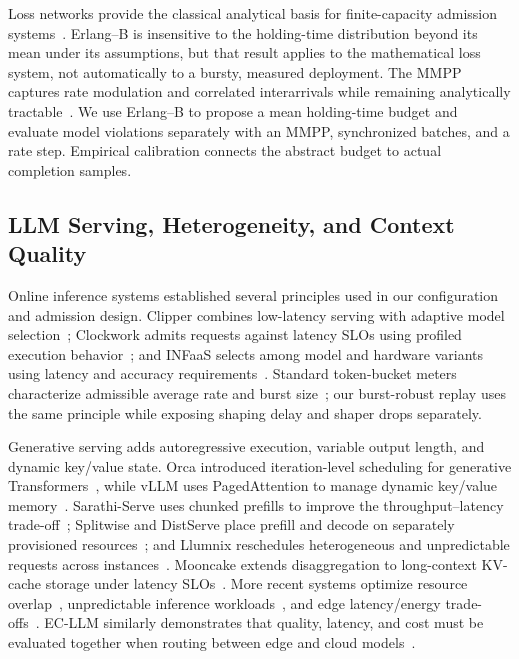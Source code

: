Loss networks provide the classical analytical basis for finite-capacity admission systems~\cite{kelly1991loss}. Erlang--B is insensitive to the holding-time distribution beyond its mean under its assumptions, but that result applies to the mathematical loss system, not automatically to a bursty, measured deployment. The MMPP captures rate modulation and correlated interarrivals while remaining analytically tractable~\cite{fischer1993mmpp}. We use Erlang--B to propose a mean holding-time budget and evaluate model violations separately with an MMPP, synchronized batches, and a rate step. Empirical calibration connects the abstract budget to actual completion samples.

\subsection{LLM Serving, Heterogeneity, and Context Quality}

Online inference systems established several principles used in our configuration and admission design. Clipper combines low-latency serving with adaptive model selection~\cite{crankshaw2017clipper}; Clockwork admits requests against latency SLOs using profiled execution behavior~\cite{gujarati2020clockwork}; and INFaaS selects among model and hardware variants using latency and accuracy requirements~\cite{romero2021infaas}. Standard token-bucket meters characterize admissible average rate and burst size~\cite{heinanen1999srtcm}; our burst-robust replay uses the same principle while exposing shaping delay and shaper drops separately.

Generative serving adds autoregressive execution, variable output length, and dynamic key/value state. Orca introduced iteration-level scheduling for generative Transformers~\cite{yu2022orca}, while vLLM uses PagedAttention to manage dynamic key/value memory~\cite{kwon2023vllm}. Sarathi-Serve uses chunked prefills to improve the throughput--latency trade-off~\cite{agrawal2024sarathi}; Splitwise and DistServe place prefill and decode on separately provisioned resources~\cite{patel2024splitwise,zhong2024distserve}; and Llumnix reschedules heterogeneous and unpredictable requests across instances~\cite{sun2024llumnix}. Mooncake extends disaggregation to long-context KV-cache storage under latency SLOs~\cite{qin2025mooncake}. More recent systems optimize resource overlap~\cite{zhu2025nanoflow}, unpredictable inference workloads~\cite{khare2025superserve}, and edge latency/energy trade-offs~\cite{tian2025clone}. EC-LLM similarly demonstrates that quality, latency, and cost must be evaluated together when routing between edge and cloud models~\cite{han2026ecllm}.

